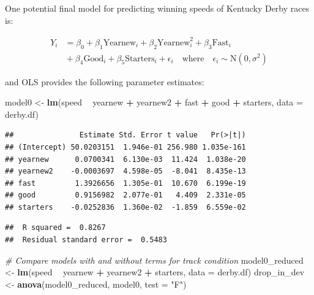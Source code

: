 \documentclass[
]{krantz}
\newenvironment{Shaded}{\begin{snugshade}}{\end{snugshade}}
\newcommand{\CommentTok}[1]{\textcolor[rgb]{0.37,0.37,0.37}{\textit{#1}}}
\newcommand{\DataTypeTok}[1]{\textcolor[rgb]{0.27,0.27,0.27}{#1}}
\newcommand{\KeywordTok}[1]{\textcolor[rgb]{0.27,0.27,0.27}{\textbf{#1}}}
\newcommand{\NormalTok}[1]{#1}
\newcommand{\OperatorTok}[1]{\textcolor[rgb]{0.43,0.43,0.43}{\textbf{#1}}}
\newcommand{\StringTok}[1]{\textcolor[rgb]{0.5,0.5,0.5}{#1}}
\begin{document}
One potential final model for predicting winning speeds of Kentucky Derby races is:

\begin{equation}
\begin{split}
 Y_{i}&=\beta_{0}+\beta_{1}\textrm{Yearnew}_{i}+\beta_{2}\textrm{Yearnew}^2_{i}+\beta_{3}\textrm{Fast}_{i}\\
      &{}+\beta_{4}\textrm{Good}_{i}+\beta_{5}\textrm{Starters}_{i}+\epsilon_{i}\quad 
      \textrm{where}\quad \epsilon_{i}\sim \textrm{N}(0,\sigma^2)
\end{split}
\label{eq:model0}
\end{equation}

and OLS provides the following parameter estimates:

\begin{Shaded}
\begin{Highlighting}[]
\NormalTok{model0 <-}\StringTok{ }\KeywordTok{lm}\NormalTok{(speed }\OperatorTok{~}\StringTok{ }\NormalTok{yearnew }\OperatorTok{+}\StringTok{ }\NormalTok{yearnew2 }\OperatorTok{+}\StringTok{ }\NormalTok{fast }\OperatorTok{+}\StringTok{ }\NormalTok{good }\OperatorTok{+}
\StringTok{               }\NormalTok{starters, }\DataTypeTok{data =}\NormalTok{ derby.df)}
\end{Highlighting}
\end{Shaded}

\begin{verbatim}
##               Estimate Std. Error t value   Pr(>|t|)
## (Intercept) 50.0203151  1.946e-01 256.980 1.035e-161
## yearnew      0.0700341  6.130e-03  11.424  1.038e-20
## yearnew2    -0.0003697  4.598e-05  -8.041  8.435e-13
## fast         1.3926656  1.305e-01  10.670  6.199e-19
## good         0.9156982  2.077e-01   4.409  2.331e-05
## starters    -0.0252836  1.360e-02  -1.859  6.559e-02
\end{verbatim}

\begin{verbatim}
##  R squared =  0.8267 
##  Residual standard error =  0.5483
\end{verbatim}

\begin{Shaded}
\begin{Highlighting}[]
\CommentTok{# Compare models with and without terms for track condition}
\NormalTok{model0_reduced <-}\StringTok{ }\KeywordTok{lm}\NormalTok{(speed }\OperatorTok{~}\StringTok{ }\NormalTok{yearnew }\OperatorTok{+}\StringTok{ }\NormalTok{yearnew2 }\OperatorTok{+}\StringTok{ }
\StringTok{                       }\NormalTok{starters, }\DataTypeTok{data =}\NormalTok{ derby.df)}
\NormalTok{drop_in_dev <-}\StringTok{ }\KeywordTok{anova}\NormalTok{(model0_reduced, model0, }\DataTypeTok{test =} \StringTok{"F"}\NormalTok{)}
\end{Highlighting}
\end{Shaded}
\end{document}
